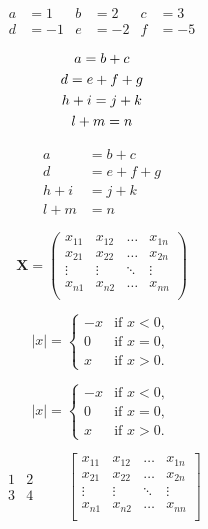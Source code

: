 \documentclass{article}
\theoremstyle{definition} \newtheorem{law}{Law}
\theoremstyle{plain} \newtheorem{jury}[law]{Jury}
\theoremstyle{remark} \newtheorem*{mar}{Margaret}
\begin{document}
\begin{align}
    a &=1 & b &=2 & c &=3 \\
    d &=-1 & e &=-2 & f &=-5
\end{align}

\begin{gather}
    a = b + c \\
    d = e + f + g \\
    h + i = j + k \notag \\
    l + m = n
\end{gather}

\begin{equation}
    \begin{aligned}
    a &= b + c \\
    d &= e + f + g \\
    h + i &= j + k \\
    l + m &= n
    \end{aligned}
\end{equation}

\[ \mathbf{X} = \left(
\begin{array}{cccc}
x_{11} & x_{12} & \ldots & x_{1n}\\
x_{21} & x_{22} & \ldots & x_{2n}\\
\vdots & \vdots & \ddots & \vdots\\
x_{n1} & x_{n2} & \ldots & x_{nn}\\
\end{array} \right) \]

\[ |x| = \left\{
\begin{array}{rl}
-x & \text{if } x < 0,\\
0 & \text{if } x = 0,\\
x & \text{if } x > 0.
\end{array} \right. \]

\[ |x| =
\begin{cases}
-x & \text{if } x < 0,\\
0 & \text{if } x = 0,\\
x & \text{if } x > 0.
\end{cases} \]

\[
\begin{matrix}
1 & 2 \\ 3 & 4
\end{matrix} \qquad
\begin{bmatrix}
x_{11} & x_{12} & \ldots & x_{1n}\\
x_{21} & x_{22} & \ldots & x_{2n}\\
\vdots & \vdots & \ddots & \vdots\\
x_{n1} & x_{n2} & \ldots & x_{nn}\\
\end{bmatrix}
\]
\end{document}
